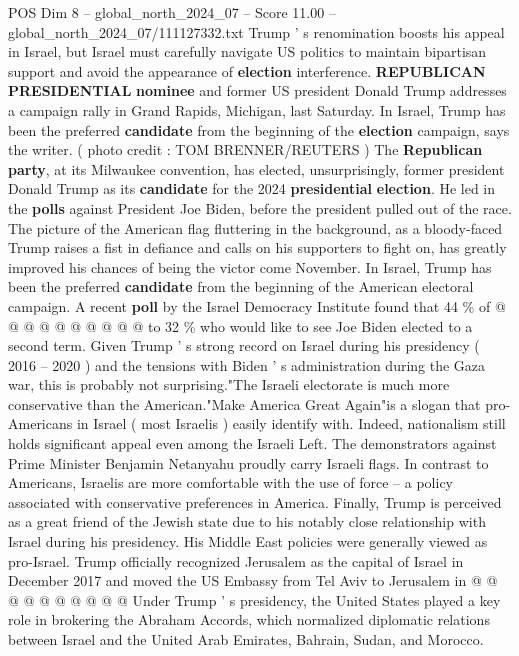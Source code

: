\begin{textsample}{POS Dim 8 – global\_north\_2024\_07 – Score 11.00 – global\_north\_2024\_07/111127332.txt}  \label{ex:f8_pos_049}
Trump ' s renomination boosts his appeal in Israel, but Israel must carefully navigate US politics to maintain bipartisan support and avoid the appearance of \textbf{election} interference. \textbf{REPUBLICAN} \textbf{PRESIDENTIAL} \textbf{nominee} and former US president Donald Trump addresses a campaign rally in Grand Rapids, Michigan, last Saturday.
In Israel, Trump has been the preferred \textbf{candidate} from the beginning of the \textbf{election} campaign, says the writer. ( photo credit : TOM BRENNER/REUTERS ) The \textbf{Republican} \textbf{party}, at its Milwaukee convention, has elected, unsurprisingly, former president Donald Trump as its \textbf{candidate} for the 2024 \textbf{presidential} \textbf{election}.
He led in the \textbf{polls} against President Joe Biden, before the president pulled out of the race.
The picture of the American flag fluttering in the background, as a bloody-faced Trump raises a fist in defiance and calls on his supporters to fight on, has greatly improved his chances of being the victor come November.
In Israel, Trump has been the preferred \textbf{candidate} from the beginning of the American electoral campaign.
A recent \textbf{poll} by the Israel Democracy Institute found that 44 \% of @ @ @ @ @ @ @ @ @ @ to 32 \% who would like to see Joe Biden elected to a second term.
Given Trump ' s strong record on Israel during his presidency ( 2016 -- 2020 ) and the tensions with Biden ' s administration during the Gaza war, this is probably not surprising."The Israeli electorate is much more conservative than the American."Make America Great Again"is a slogan that pro-Americans in Israel ( most Israelis ) easily identify with.
Indeed, nationalism still holds significant appeal even among the Israeli Left.
The demonstrators against Prime Minister Benjamin Netanyahu proudly carry Israeli flags.
In contrast to Americans, Israelis are more comfortable with the use of force -- a policy associated with conservative preferences in America.
Finally, Trump is perceived as a great friend of the Jewish state due to his notably close relationship with Israel during his presidency.
His Middle East policies were generally viewed as pro-Israel.
Trump officially recognized Jerusalem as the capital of Israel in December 2017 and moved the US Embassy from Tel Aviv to Jerusalem in @ @ @ @ @ @ @ @ @ @ Under Trump ' s presidency, the United States played a key role in brokering the Abraham Accords, which normalized diplomatic relations between Israel and the United Arab Emirates, Bahrain, Sudan, and Morocco.

\end{textsample}
